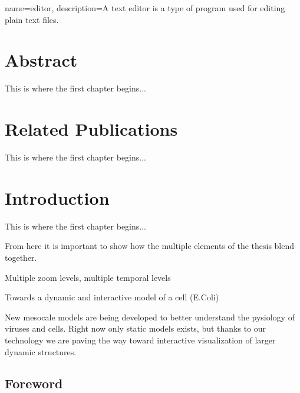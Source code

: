 
{
	name={editor},
	description={A text editor is a type of program used for editing plain text files.}
}

\chapter{Abstract}


This is where the first chapter begins...


\chapter{Related Publications}


This is where the first chapter begins...

\chapter{Introduction}


This is where the first chapter begins...

From here it is important to show how the multiple elements of the thesis blend together.

Multiple zoom levels, multiple temporal levels

Towards a dynamic and interactive model of a cell (E.Coli)



New mesocale models are being developed to better understand the pysiology of viruses and cells.
Right now only static models exists, but thanks to our technology we are paving the way toward interactive visualization of larger dynamic structures.



%

\section{Foreword}

